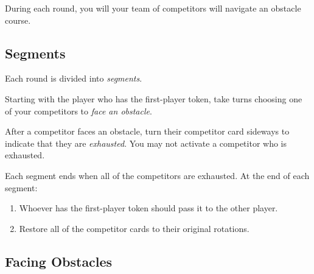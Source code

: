 \documentclass[a6paper, 11pt, parskip=half, DIV=15]{scrartcl}
\begin{document}
During each round, you will your team of competitors will navigate an obstacle course.


\subsection*{Segments}
Each round is divided into \emph{segments}.

Starting with the player who has the first-player token, take turns choosing one of your competitors to \emph{face an obstacle}.


After a competitor faces an obstacle, turn their competitor card sideways to indicate that they are \emph{exhausted}. You may not activate a competitor who is exhausted.

Each segment ends when all of the competitors are exhausted.
At the end of each segment:
\begin{enumerate}
\item Whoever has the first-player token should pass it to the other player.
\item Restore all of the competitor cards to their original rotations.
\end{enumerate}



\newpage
\subsection*{Facing Obstacles}
\end{document}
